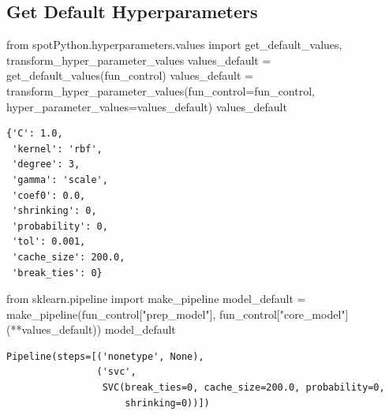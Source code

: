 \documentclass[
  letterpaper,
  DIV=11,
  numbers=noendperiod]{scrreprt}
\newenvironment{Shaded}{\begin{snugshade}}{\end{snugshade}}
\newcommand{\ImportTok}[1]{\textcolor[rgb]{0.00,0.46,0.62}{#1}}
\newcommand{\NormalTok}[1]{\textcolor[rgb]{0.00,0.23,0.31}{#1}}
\newcommand{\OperatorTok}[1]{\textcolor[rgb]{0.37,0.37,0.37}{#1}}
\newcommand{\StringTok}[1]{\textcolor[rgb]{0.13,0.47,0.30}{#1}}
\begin{document}
\hypertarget{get-default-hyperparameters-3}{%
\subsection{Get Default
Hyperparameters}\label{get-default-hyperparameters-3}}

\begin{Shaded}
\begin{Highlighting}[]
\ImportTok{from}\NormalTok{ spotPython.hyperparameters.values }\ImportTok{import}\NormalTok{ get\_default\_values, transform\_hyper\_parameter\_values}
\NormalTok{values\_default }\OperatorTok{=}\NormalTok{ get\_default\_values(fun\_control)}
\NormalTok{values\_default }\OperatorTok{=}\NormalTok{ transform\_hyper\_parameter\_values(fun\_control}\OperatorTok{=}\NormalTok{fun\_control, hyper\_parameter\_values}\OperatorTok{=}\NormalTok{values\_default)}
\NormalTok{values\_default}
\end{Highlighting}
\end{Shaded}

\begin{verbatim}
{'C': 1.0,
 'kernel': 'rbf',
 'degree': 3,
 'gamma': 'scale',
 'coef0': 0.0,
 'shrinking': 0,
 'probability': 0,
 'tol': 0.001,
 'cache_size': 200.0,
 'break_ties': 0}
\end{verbatim}

\begin{Shaded}
\begin{Highlighting}[]
\ImportTok{from}\NormalTok{ sklearn.pipeline }\ImportTok{import}\NormalTok{ make\_pipeline}
\NormalTok{model\_default }\OperatorTok{=}\NormalTok{ make\_pipeline(fun\_control[}\StringTok{"prep\_model"}\NormalTok{], fun\_control[}\StringTok{"core\_model"}\NormalTok{](}\OperatorTok{**}\NormalTok{values\_default))}
\NormalTok{model\_default}
\end{Highlighting}
\end{Shaded}

\begin{verbatim}
Pipeline(steps=[('nonetype', None),
                ('svc',
                 SVC(break_ties=0, cache_size=200.0, probability=0,
                     shrinking=0))])
\end{verbatim}
\end{document}
